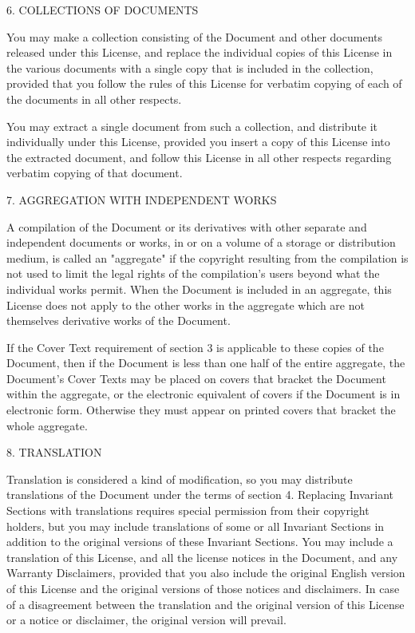 \documentclass{article}
\begin{document}
6. COLLECTIONS OF DOCUMENTS 

You may make a collection consisting of the Document and other documents released under this License, and replace the individual copies of this License in the various documents with a single copy that is included in the collection, provided that you follow the rules of this License for verbatim copying of each of the documents in all other respects. 

You may extract a single document from such a collection, and distribute it individually under this License, provided you insert a copy of this License into the extracted document, and follow this License in all other respects regarding verbatim copying of that document. 

7. AGGREGATION WITH INDEPENDENT WORKS 

A compilation of the Document or its derivatives with other separate and independent documents or works, in or on a volume of a storage or distribution medium, is called an "aggregate" if the copyright resulting from the compilation is not used to limit the legal rights of the compilation's users beyond what the individual works permit. When the Document is included in an aggregate, this License does not apply to the other works in the aggregate which are not themselves derivative works of the Document. 



If the Cover Text requirement of section 3 is applicable to these copies of the Document, then if the Document is less than one half of the entire aggregate, the Document's Cover Texts may be placed on covers that bracket the Document within the aggregate, or the electronic equivalent of covers if the Document is in electronic form. Otherwise they must appear on printed covers that bracket the whole aggregate. 

8. TRANSLATION 

Translation is considered a kind of modification, so you may distribute translations of the Document under the terms of section 4. Replacing Invariant Sections with translations requires special permission from their copyright holders, but you may include translations of some or all Invariant Sections in addition to the original versions of these Invariant Sections. You may include a translation of this License, and all the license notices in the Document, and any Warranty Disclaimers, provided that you also include the original English version of this License and the original versions of those notices and disclaimers. In case of a disagreement between the translation and the original version of this License or a notice or disclaimer, the original version will prevail. 
\end{document}
